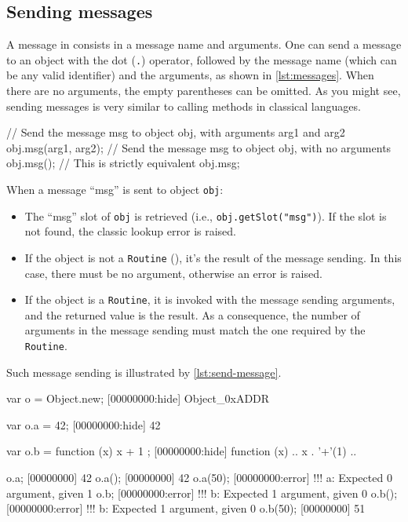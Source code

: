 \subsection{Sending messages}

A message in \us consists in a message name and arguments. One can
send a message to an object with the dot (\lstinline|.|) operator,
followed by the message name (which can be any valid identifier) and
the arguments, as shown in \autoref{lst:messages}. When there are no
arguments, the empty parentheses can be omitted. As you might see,
sending messages is very similar to calling methods in classical
languages.

\begin{urbiscript}[caption=Sending messages, label=lst:messages,
  float=\floatpos]
// Send the message msg to object obj, with arguments arg1 and arg2
obj.msg(arg1, arg2);
// Send the message msg to object obj, with no arguments
obj.msg();
// This is strictly equivalent
obj.msg;
\end{urbiscript}

When a message ``msg'' is sent to object \lstinline|obj|:

\begin{itemize}
\item The ``msg'' slot of \lstinline|obj| is retrieved (i.e.,
  \lstinline|obj.getSlot("msg")|). If the slot is not found, the
  classic lookup error is raised.
\item If the object is not a \lstinline|Routine| (), it's
  the result of the message sending. In this case, there must be no
  argument, otherwise an error is raised.
\item If the object is a \lstinline|Routine|, it is invoked with the
  message sending arguments, and the returned value is the result. As
  a consequence, the number of arguments in the message sending must
  match the one required by the \lstinline|Routine|.
\end{itemize}

Such message sending is illustrated by \autoref{lst:send-message}.

\begin{urbiscript}[caption=Sending messages, label=lst:send-message,
  float=\floatpos]
var o = Object.new;
[00000000:hide] Object_0xADDR

var o.a = 42;
[00000000:hide] 42

var o.b = function (x) { x + 1 };
[00000000:hide] function (x) {
..  x . '+'(1)
..}

o.a;
[00000000] 42
o.a();
[00000000] 42
o.a(50);
[00000000:error] !!! a: Expected 0 argument, given 1
o.b;
[00000000:error] !!! b: Expected 1 argument, given 0
o.b();
[00000000:error] !!! b: Expected 1 argument, given 0
o.b(50);
[00000000] 51
\end{urbiscript}

